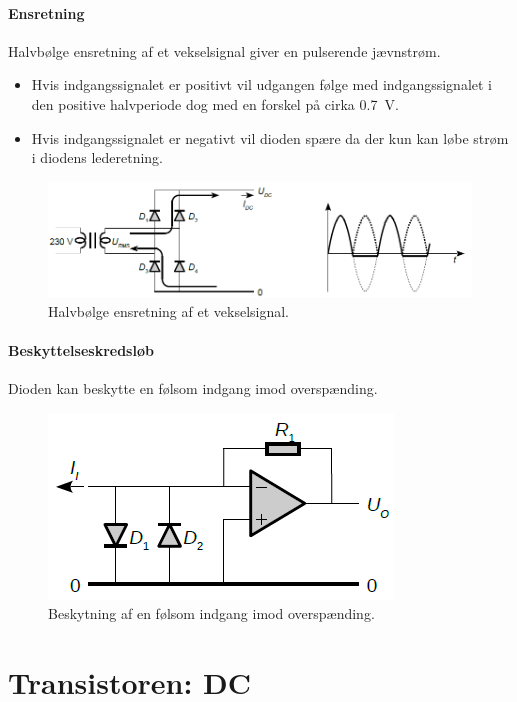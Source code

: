 \documentclass[danish]{article}
\begin{document}
\paragraph{Ensretning} Halvbølge ensretning af et vekselsignal giver en pulserende jævnstrøm.

\begin{itemize}
	\item Hvis indgangssignalet er positivt vil udgangen følge med indgangssignalet i den positive halvperiode dog med en forskel på cirka \SI{0,7}{\volt}.
	\item Hvis indgangssignalet er negativt vil dioden spære da der kun kan løbe strøm i diodens lederetning.
\end{itemize}

\begin{figure} [H]
	\centering
	\includegraphics[width=\linewidth]{graphics/ensretning}
	\caption{Halvbølge ensretning af et vekselsignal.}
	\label{fig:ensretning}
\end{figure}

\paragraph{Beskyttelseskredsløb} Dioden kan beskytte en følsom indgang imod overspænding.

\begin{figure} [H]
	\centering
	\includegraphics[width=0.5\linewidth]{graphics/diodebeskyt}
	\caption{Beskytning af en følsom indgang imod overspænding.}
	\label{fig:diodebeskyt}
\end{figure}

\newpage
\section{Transistoren: DC}
\end{document}
